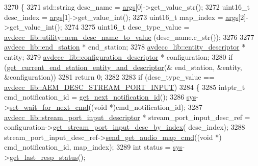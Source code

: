 \begin{DoxyCode}
3270 \{
3271     std::string desc\_name = \hyperlink{namespaceastime__fitline_a8187411843a6284ffb964ef3fb9fcab3}{args}[0]->get\_value\_str();
3272     uint16\_t desc\_index = \hyperlink{namespaceastime__fitline_a8187411843a6284ffb964ef3fb9fcab3}{args}[1]->get\_value\_int();
3273     uint16\_t map\_index = \hyperlink{namespaceastime__fitline_a8187411843a6284ffb964ef3fb9fcab3}{args}[2]->get\_value\_int();
3274 
3275     uint16\_t desc\_type\_value = \hyperlink{namespaceavdecc__lib_1_1utility_a9f6076e32fa227555a95b6e95ea1e29b}{avdecc\_lib::utility::aem\_desc\_name\_to\_value}
      (desc\_name.c\_str());
3276 
3277     \hyperlink{classavdecc__lib_1_1end__station}{avdecc\_lib::end\_station} * end\_station;
3278     \hyperlink{classavdecc__lib_1_1entity__descriptor}{avdecc\_lib::entity\_descriptor} * entity;
3279     \hyperlink{classavdecc__lib_1_1configuration__descriptor}{avdecc\_lib::configuration\_descriptor} * configuration;
3280     \textcolor{keywordflow}{if} (\hyperlink{classcmd__line_ac2d4611fba7db03d436a2e3c1e64828e}{get\_current\_end\_station\_entity\_and\_descriptor}(&
      end\_station, &entity, &configuration))
3281         \textcolor{keywordflow}{return} 0;
3282 
3283     \textcolor{keywordflow}{if} (desc\_type\_value == \hyperlink{namespaceavdecc__lib_ac7b7d227e46bc72b63ee9e9aae15902fa54a680de439da84c5d5037a246d55b3f}{avdecc\_lib::AEM\_DESC\_STREAM\_PORT\_INPUT})
3284     \{
3285         intptr\_t cmd\_notification\_id = \hyperlink{classcmd__line_a57486218387d1aa9d262eb7c176154ad}{get\_next\_notification\_id}();
3286         \hyperlink{classcmd__line_a485db4800e331cb4052c447fdf5d154e}{sys}->\hyperlink{classavdecc__lib_1_1system_a26b769584f10225077da47583edda33e}{set\_wait\_for\_next\_cmd}((\textcolor{keywordtype}{void} *)cmd\_notification\_id);
3287         \hyperlink{classavdecc__lib_1_1stream__port__input__descriptor}{avdecc\_lib::stream\_port\_input\_descriptor} * 
      stream\_port\_input\_desc\_ref = configuration->\hyperlink{classavdecc__lib_1_1configuration__descriptor_ad05646251e84a4024f317dd82395b8f7}{get\_stream\_port\_input\_desc\_by\_index}(
      desc\_index);
3288         stream\_port\_input\_desc\_ref->\hyperlink{classavdecc__lib_1_1stream__port__input__descriptor_a685ec3b997e066fc3530a3cd213f581b}{send\_get\_audio\_map\_cmd}((\textcolor{keywordtype}{void} *)
      cmd\_notification\_id, map\_index);
3289         \textcolor{keywordtype}{int} status = \hyperlink{classcmd__line_a485db4800e331cb4052c447fdf5d154e}{sys}->\hyperlink{classavdecc__lib_1_1system_aa63e8d1a4e51f695cdcccc9340922407}{get\_last\_resp\_status}();

\end{DoxyCode}
